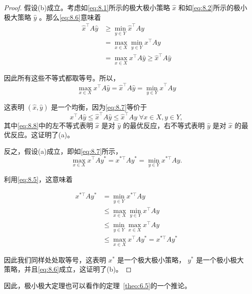 \begin{proof}
 假设(b)成立。考虑如\eqref{eq:8.1}所示的极大极小策略 \(\widehat{x}\) 和如\eqref{eq:8.2}所示的极小极大策略 \(\widehat{y}\) 。那么\eqref{eq:8.6}意味着
\begin{align*}
{\widehat{x}}^{\top }A\widehat{y} &\geq  \min_{{y \in  Y}}{\widehat{x}}^{\top }{Ay}\\
&=\max_{{x \in  X}}\min_{{y \in  Y}}{x}^{\top }{Ay}\\
&=\max_{{x \in  X}}{x}^{\top }A\widehat{y} \geq  {\widehat{x}}^{\top }A\widehat{y}
\end{align*}


因此所有这些不等式都取等号。所以，
\begin{equation}\label{eq:8.7}
\max_{{x \in  X}}{x}^{\top }A\widehat{y} = {\widehat{x}}^{\top }A\widehat{y} = \min_{{y \in  Y}}{\widehat{x}}^{\top }{Ay}
\end{equation}

这表明 \(\left( {\widehat{x},\widehat{y}}\right)\) 是一个均衡，因为\eqref{eq:8.7}等价于
\begin{equation}\label{eq:8.8}
{x}^{\top }A\widehat{y} \leq  {\widehat{x}}^{\top }A\widehat{y} \leq  {\widehat{x}}^{\top }{Ay}\;\forall x \in  X,y \in  Y,
\end{equation}
其中\eqref{eq:8.8}中的左不等式表明 \(\widehat{x}\) 是对 \(\widehat{y}\) 的最优反应，右不等式表明 \(\widehat{y}\) 是对 \(\widehat{x}\) 的最优反应。这证明了(a)。

反之，假设(a)成立，即如\eqref{eq:8.7}所示，
\[
\max_{{x \in  X}}{x}^{\top }A{y}^{ * } = {x}^{*\top }A{y}^{ * } = \min_{{y \in  Y}}{x}^{*\top }{Ay}.
\]

利用\eqref{eq:8.5}，这意味着

\begin{align*}
{x}^{*\top }A{y}^{*} &= \min_{{y \in  Y}}{x}^{*\top }{Ay}\\
&\leq \max_{{x \in  X}}\min_{{y \in  Y}}{x}^{\top }{Ay}\\
&\leq  \min_{{y \in  Y}}\max_{{x \in  X}}{x}^{\top }{Ay}\\
&\leq \max_{{x \in  X}}{x}^{\top }A{y}^{ * } = {x}^{*\top }A{y}^*
\end{align*}

因此我们同样处处取等号，这表明 \({x}^{ * }\) 是一个极大极小策略， \({y}^{ * }\) 是一个极小极大策略，并且\eqref{eq:8.6}成立，这证明了(b)。
\end{proof}


因此，极小极大定理也可以看作\citet{nash1951}的定理~\ref{theo:6.5}的一个推论。


